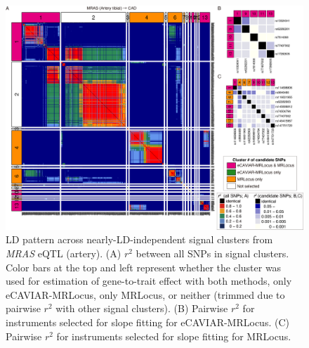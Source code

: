 \documentclass[11pt]{article}
\begin{document}
\begin{figure}[!ht]
  \centering
  \includegraphics[width=\textwidth]{figs/region/heatmap_eQTLbase.Artery_MRAS_CAD.20210114.png}
  \caption{LD pattern across nearly-LD-independent signal clusters
    from \emph{MRAS} eQTL (artery).
    (A) $r^2$ between all SNPs in signal clusters. Color bars at the
    top and left represent whether the cluster was used for estimation of
    gene-to-trait effect with both methods, only eCAVIAR-MRLocus, only
    MRLocus, or neither (trimmed due to pairwise $r^2$ with other
    signal clusters). (B) Pairwise $r^2$ for instruments selected for
    slope fitting for eCAVIAR-MRLocus. (C) Pairwise $r^2$ for
    instruments selected for slope fitting for MRLocus.}
\end{figure}
\end{document}
